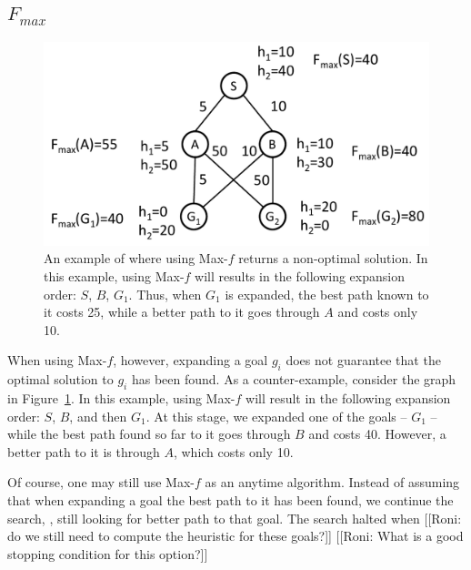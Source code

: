 \documentclass{aicom2e}
\begin{document}
\subsection{$F_{max}$}
 
 \begin{figure}
 \includegraphics[width=\columnwidth]{max-bad_cropped.pdf}      
 \caption{An example of where using Max-$f$ returns a non-optimal solution. In this example, 
 using Max-$f$ will results in the following expansion order: $S$, $B$, $G_1$. 
 Thus, when $G_1$ is expanded, the best path known to it costs 25, while a 
 better path to it goes through $A$ and costs only 10.}
 \label{fig:max-bad}
 \end{figure}
 
 When using Max-$f$, however, expanding a goal $g_i$ does not guarantee
 that the optimal solution to $g_i$ has been found. As a counter-example, consider 
 the graph in Figure~\ref{fig:max-bad}.
 In this example, using Max-$f$ will result in the following expansion order: $S$, $B$, and then $G_1$. At this stage, we expanded one of the goals -- $G_1$ -- while the best path found so far to it goes through $B$ and costs 40. However, a better path to it is through $A$, which costs only 10.
 
 
 Of course, one may still use Max-$f$ as an anytime algorithm. 
 Instead of assuming that when expanding a goal the best path to it has been found, we continue the search, , still looking for better path to that goal. The search halted when 
 [[Roni: do we still need to compute the heuristic for these goals?]]
 [[Roni: What is a good stopping condition for this option?]]
 
\end{document}
